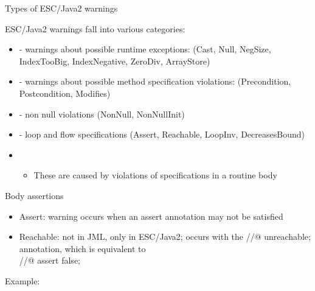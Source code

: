 \documentclass[
pdf,
nocolorBG,
slideColor,
cok,
]{prosper}
\begin{document}

\begin{slide}{Types of ESC/Java2 warnings}
\vspace*{-6ex}

ESC/Java2 warnings fall into various categories:
\begin{itemize}
\item[] - {\gray warnings about possible { runtime exceptions}:
(Cast, Null, NegSize, IndexTooBig, IndexNegative, ZeroDiv, ArrayStore)}

\item[] - {\gray warnings about possible method { specification violations}:
(Precondition, Postcondition, Modifies)}

\item[] - {\gray non null violations (NonNull, NonNullInit)}

\item[] - {\knalblue loop} and {\knalblue flow} specifications (Assert, Reachable, LoopInv, DecreasesBound)

\item[]
\begin{itemize}
\item These are caused by violations of specifications in a routine body
\end{itemize}

\end{itemize}
\end{slide}
\begin{slide}{Body assertions}
\scriptsize
\vspace*{-10ex}

\begin{itemize}
\item {\knalblue Assert}: warning occurs when an {\blue assert} annotation may not be satisfied
\item {\knalblue Reachable}: not in JML, only in ESC/Java2; occurs with the
{\blue //@ unreachable;}
annotation, which is equivalent to\\ {\blue //@ assert false; }
\end{itemize}
\tiny
Example:
\begin{figure*}

\end{figure*}
\end{slide}
\end{document}
